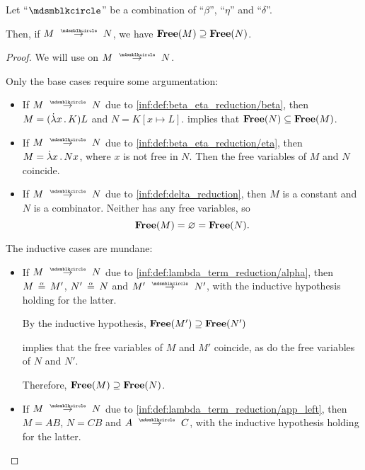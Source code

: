 \begin{proposition}\label{thm:lambda_term_reduction_free_variables}
  Let \enquote{\( {\Anon} \)} be a combination of \enquote{\( \beta \)}, \enquote{\( \eta \)} and \enquote{\( \delta \)}.

  Then, if \( M \pred N \), we have \( \op*{Free}(M) \supseteq \op*{Free}(N) \).
\end{proposition}
\begin{proof}
  We will use  on \( M \pred N \).

  Only the base cases require some argumentation:
  \begin{itemize}
    \item If \( M \pred N \) due to \ref{inf:def:beta_eta_reduction/beta}, then \( M = (\qabs x K) L \) and \( N = K[x \mapsto L] \).  implies that \( \op*{Free}(N) \subseteq \op*{Free}(M) \).

    \item If \( M \pred N \) due to \ref{inf:def:beta_eta_reduction/eta}, then \( M = \qabs x N x \), where \( x \) is not free in \( N \). Then the free variables of \( M \) and \( N \) coincide.

    \item If \( M \pred N \) due to \ref{inf:def:delta_reduction}, then \( M \) is a constant and \( N \) is a combinator. Neither has any free variables, so
    \begin{equation*}
      \op*{Free}(M) = \varnothing = \op*{Free}(N).
    \end{equation*}
  \end{itemize}

  The inductive cases are mundane:
  \begin{itemize}
    \item If \( M \pred N \) due to \ref{inf:def:lambda_term_reduction/alpha}, then \( M \aequiv M' \), \( N' \aequiv N \) and \( M' \pred N' \), with the inductive hypothesis holding for the latter.

    By the inductive hypothesis, \( \op*{Free}(M') \supseteq \op*{Free}(N') \)

     implies that the free variables of \( M \) and \( M' \) coincide, as do the free variables of \( N \) and \( N' \).

    Therefore, \( \op*{Free}(M) \supseteq \op*{Free}(N) \).

    \item If \( M \pred N \) due to \ref{inf:def:lambda_term_reduction/app_left}, then \( M = AB \), \( N = CB \) and \( A \pred C \), with the inductive hypothesis holding for the latter.


\end{itemize}
\end{proof}
